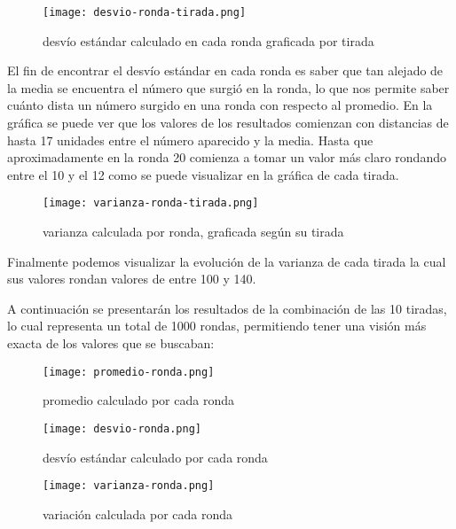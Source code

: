 \begin{minipage}{0.5\textwidth}
  \begin{figure}[H]
  \centering
  \texttt{[image: desvio-ronda-tirada.png]}
  \caption{desvío estándar calculado en cada ronda graficada por tirada}
  \label{fig:desvio-ronda-tirada}
  \end{figure}
\end{minipage}%
\begin{minipage}{0.5\textwidth}
El fin de encontrar el desvío estándar en cada ronda es saber que tan alejado de la media se encuentra el número que surgió en la ronda, lo que nos permite saber cuánto dista un número surgido en una ronda con respecto al promedio. En la gráfica se puede ver que los valores de los resultados comienzan con distancias de hasta 17 unidades entre el número aparecido y la media. Hasta que aproximadamente en la ronda 20 comienza a tomar un valor más claro rondando entre el 10 y el 12 como se puede visualizar en la gráfica de cada tirada.
\end{minipage}

\begin{minipage}{0.5\textwidth}
  \begin{figure}[H]
  \centering
  \texttt{[image: varianza-ronda-tirada.png]}
  \caption{varianza calculada por ronda, graficada según su tirada}
  \label{fig:varianza-ronda-tirada}
  \end{figure}
\end{minipage}%
\begin{minipage}{0.5\textwidth}
Finalmente podemos visualizar la evolución de la varianza de cada tirada la cual sus valores rondan valores de entre 100 y 140.
\end{minipage}

A continuación se presentarán los resultados de la combinación de las 10 tiradas, lo cual representa un total de 1000 rondas, permitiendo tener una visión más exacta de los valores que se buscaban:
\begin{figure}[H]
  \centering
  \texttt{[image: promedio-ronda.png]}
  \label{fig:promedio-ronda}
  \caption{promedio calculado por cada ronda}
\end{figure}
\begin{minipage}{0.5\textwidth}
  \begin{figure}[H]
    \centering
    \texttt{[image: desvio-ronda.png]}
    \label{fig:desvio-ronda}
    \caption{desvío estándar calculado por cada ronda}
  \end{figure}
\end{minipage}%
\begin{minipage}{0.5\textwidth}
  \begin{figure}[H]
    \centering
    \texttt{[image: varianza-ronda.png]}
    \label{fig:varianza-ronda}
    \caption{variación calculada por cada ronda}
  \end{figure}
\end{minipage}

